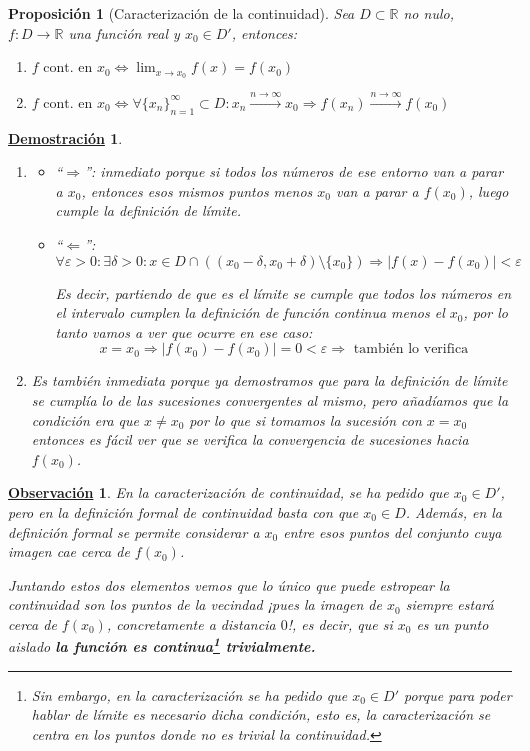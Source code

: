 \documentclass[10pt,a4paper,openright]{book}
\theoremstyle{break}
\newtheorem{prop}{Proposición}[chapter]
\newtheorem*{demo}{\underline{Demostración}}
\newtheorem{obs}{\underline{Observación}}[chapter]
\begin{document}
\begin{prop}[Caracterización de la continuidad]
Sea $D\subset \mathbb R$ no nulo, $f: D\longrightarrow \mathbb R$ una función real y $x_0\in D'$, entonces:
\begin{enumerate}
\item $f\mbox{ cont. en }x_0 \Leftrightarrow \lim_{x\rightarrow x_0} f(x)=f(x_0)$
\item $f\mbox{ cont. en }x_0 \Leftrightarrow \forall \{x_n\}_{n=1}^\infty\subset D: x_n\xrightarrow{n\rightarrow \infty} x_0\Rightarrow f(x_n)\xrightarrow{n\rightarrow \infty} f(x_0)$
\end{enumerate}
\end{prop}
\begin{demo}
\begin{enumerate}
\item 
\begin{itemize}
\item ``$\Rightarrow $'': inmediato porque si todos los números de ese entorno van a parar a $x_0$, entonces esos mismos puntos menos $x_0$ van a parar a $f(x_0)$, luego cumple la definición de límite.

\item ``$\Leftarrow$'':
$$\forall \varepsilon>0 : \exists \delta >0 : x\in D\cap\left( (x_0-\delta, x_0+\delta)\mbox{\textbackslash}\{x_0\}\right)\Rightarrow |f(x)-f(x_0)|<\varepsilon$$

Es decir, partiendo de que es el límite se cumple que todos los números en el intervalo cumplen la definición de función continua menos el $x_0$, por lo tanto vamos a ver que ocurre en ese caso:
$$x=x_0\Rightarrow |f(x_0)-f(x_0)|=0<\varepsilon\Rightarrow \mbox{ también lo verifica}$$
\end{itemize}

\item Es también inmediata porque ya demostramos que para la definición de límite se cumplía lo de las sucesiones convergentes al mismo, pero añadíamos que la condición era que $x\neq x_0$ por lo que si tomamos la sucesión con $x=x_0$ entonces es fácil ver que se verifica la convergencia de sucesiones hacia $f(x_0)$.
\end{enumerate}
\end{demo}

\begin{obs}
En la caracterización de continuidad, se ha pedido que $x_0\in D'$, pero en la definición formal de continuidad basta con que $x_0\in D$. Además, en la definición formal se permite considerar a $x_0$ entre esos puntos del conjunto cuya imagen cae cerca de $f(x_0)$.

Juntando estos dos elementos vemos que lo único que puede estropear la continuidad son los puntos de la vecindad ¡pues la imagen de $x_0$ siempre estará cerca de $f(x_0)$, concretamente a distancia $0$!, es decir, que si $x_0$ es un punto aislado \textbf{la función es continua\footnote{Sin embargo, en la caracterización se ha pedido que $x_0\in D'$ porque para poder hablar de límite es necesario dicha condición, esto es, la caracterización se centra en los puntos donde no es trivial la continuidad.} trivialmente.}
\end{obs}
\end{document}
